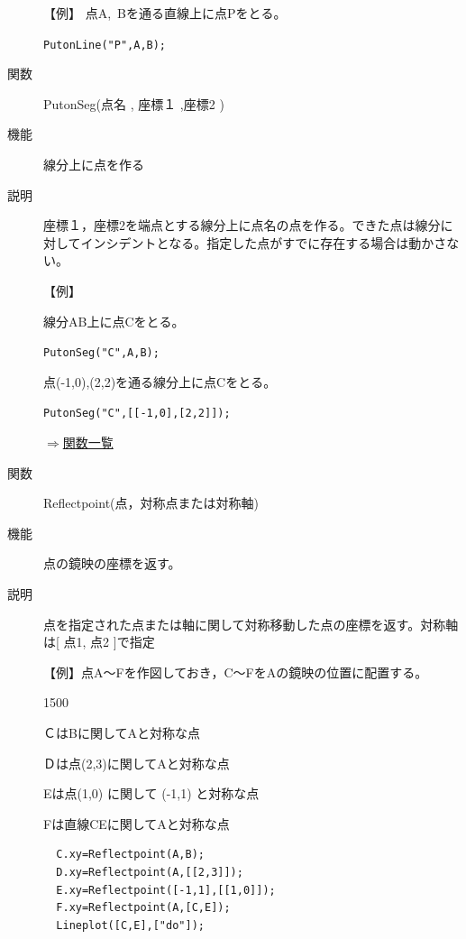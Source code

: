 \documentclass[papersize,a4paper,12pt,uplatex]{jsarticle}
\begin{document}
\begin{description}
\vspace{\baselineskip}
【例】  点A,\ Bを通る直線上に点Pをとる。

  \verb|PutonLine("P",A,B);|

\vspace{\baselineskip}
\hypertarget{putonseg}{}
\item[関数]  PutonSeg(点名 , 座標１ ,座標2 )
\item[機能]  線分上に点を作る
\item[説明]  座標１，座標2を端点とする線分上に点名の点を作る。できた点は線分に対してインシデントとなる。指定した点がすでに存在する場合は動かさない。

\vspace{\baselineskip}
【例】

線分AB上に点Cをとる。

 \verb|PutonSeg("C",A,B);|

点(-1,0),(2,2)を通る線分上に点Cをとる。

 \verb|PutonSeg("C",[[-1,0],[2,2]]);|

\begin{flushright}  \hyperlink{functionlist}{$\Rightarrow$関数一覧}\end{flushright}

\vspace{\baselineskip}
\hypertarget{reflectpoint}{}
\item[関数]  Reflectpoint(点，対称点または対称軸)
\item[機能]  点の鏡映の座標を返す。
\item[説明]  点を指定された点または軸に関して対称移動した点の座標を返す。対称軸は[ 点1, 点2 ]で指定

\vspace{\baselineskip}
【例】点A〜Fを作図しておき，C〜FをAの鏡映の位置に配置する。

\begin{layer}{150}{0}
\end{layer}

\hspace{5mm} ＣはBに関してAと対称な点

\hspace{5mm} Ｄは点(2,3)に関してAと対称な点

\hspace{5mm} Eは点(1,0) に関して (-1,1) と対称な点

\hspace{5mm} Fは直線CEに関してAと対称な点

\begin{verbatim}
  C.xy=Reflectpoint(A,B);
  D.xy=Reflectpoint(A,[[2,3]]);
  E.xy=Reflectpoint([-1,1],[[1,0]]);
  F.xy=Reflectpoint(A,[C,E]);
  Lineplot([C,E],["do"]);
\end{verbatim}


\end{description}
\end{document}
